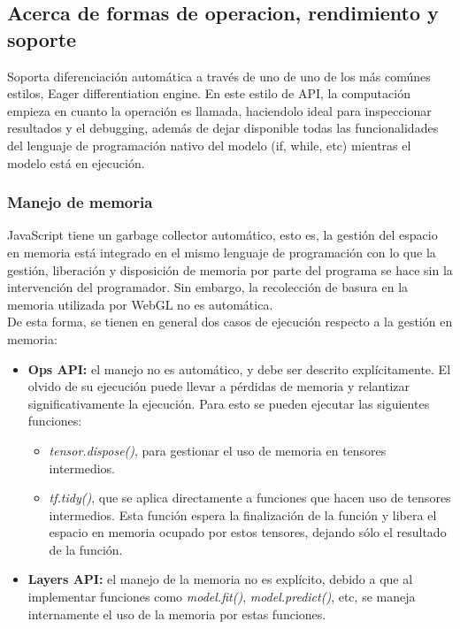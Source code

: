 \subsection{Acerca de formas de operacion, rendimiento y soporte}

Soporta diferenciación automática a través de uno de uno de los más comúnes estilos, Eager differentiation engine.
En este estilo de API, la computación empieza en cuanto la operación es llamada, haciendolo ideal para inspeccionar resultados
y el debugging, además de dejar disponible todas las funcionalidades del lenguaje de programación nativo del modelo
(if, while, etc) mientras el modelo está en ejecución.

\subsubsection{Manejo de memoria}

JavaScript tiene un garbage collector automático, esto es, la gestión del espacio en memoria está integrado en el mismo
lenguaje de programación con lo que la gestión, liberación y disposición de memoria por parte del programa se hace sin
la intervención del programador.
Sin embargo, la recolección de basura en la memoria utilizada por WebGL no es automática. \\
De esta forma, se tienen en general dos casos de ejecución respecto a la gestión en memoria:

\begin{itemize}
    \item \textbf{Ops API:} el manejo no es automático, y debe ser descrito explícitamente. El olvido de su ejecución puede llevar a
pérdidas de memoria y relantizar significativamente la ejecución. Para esto se pueden ejecutar las siguientes funciones:
    \begin{itemize}
        \item \emph{tensor.dispose()}, para gestionar el uso de memoria en tensores intermedios.
        \item \emph{tf.tidy()}, que se aplica directamente a funciones que hacen uso de tensores intermedios. Esta función espera
        la finalización de la función y libera el espacio en memoria ocupado por estos tensores, dejando sólo el
        resultado de la función.
    \end{itemize}

    \item \textbf{Layers API:} el manejo de la memoria no es explícito, debido a que al implementar funciones como
    \emph{model.fit()}, \emph{model.predict()}, etc, se maneja internamente el uso de la memoria por estas funciones.
\end{itemize}

